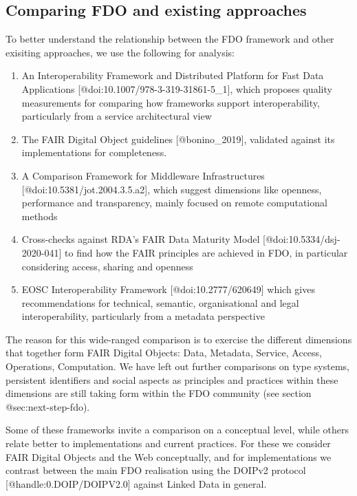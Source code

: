 \hypertarget{sec:comparing}{%
\subsection{Comparing FDO and existing approaches}\label{sec:comparing}}

To better understand the relationship between the FDO framework and
other exisiting approaches, we use the following for analysis:

\begin{enumerate}
\def\labelenumi{\arabic{enumi}.}
\tightlist
\item
  An Interoperability Framework and Distributed Platform for Fast Data
  Applications {[}@doi:10.1007/978-3-319-31861-5\_1{]}, which proposes
  quality measurements for comparing how frameworks support
  interoperability, particularly from a service architectural view
\item
  The FAIR Digital Object guidelines {[}@bonino\_2019{]}, validated
  against its implementations for completeness.
\item
  A Comparison Framework for Middleware Infrastructures
  {[}@doi:10.5381/jot.2004.3.5.a2{]}, which suggest dimensions like
  openness, performance and transparency, mainly focused on remote
  computational methods
\item
  Cross-checks against RDA's FAIR Data Maturity Model
  {[}@doi:10.5334/dsj-2020-041{]} to find how the FAIR principles are
  achieved in FDO, in particular considering access, sharing and
  openness
\item
  EOSC Interoperability Framework {[}@doi:10.2777/620649{]} which gives
  recommendations for technical, semantic, organisational and legal
  interoperability, particularly from a metadata perspective
\end{enumerate}

The reason for this wide-ranged comparison is to exercise the different
dimensions that together form FAIR Digital Objects: Data, Metadata,
Service, Access, Operations, Computation. We have left out further
comparisons on type systems, persistent identifiers and social aspects
as principles and practices within these dimensions are still taking
form within the FDO community (see section @sec:next-step-fdo).

Some of these frameworks invite a comparison on a conceptual level,
while others relate better to implementations and current practices. For
these we consider FAIR Digital Objects and the Web conceptually, and for
implementations we contrast between the main FDO realisation using the
DOIPv2 protocol {[}@handle:0.DOIP/DOIPV2.0{]} against Linked Data in
general.

